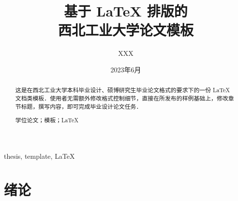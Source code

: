 \documentclass[lang=chs, degree=phd, blindreview=false, adobe=false]{yanputhesis}
\title{基于 LaTeX 排版的 \\ 西北工业大学论文模板}{          %
    Yet Another Thesis Template of \\ Northwestern Polytechnical University
}                                                           %
\author{XXX}{Yilong Ma}                              %
\date{2023年6月}{Jun 2023}                                  %
\begin{document}
\frontmatter                                                %
\maketitle                                                  %
\begin{abstract}                                            %
    这是在西北工业大学本科毕业设计、硕博研究生毕业论文格式的要求下的一份 LaTeX
    文档类模板．使用者无需额外修改格式控制细节，直接在所发布的样例基础上，修改章
    节标题，撰写内容，即可完成毕业设计论文任务．            %
    \begin{keywords}                                        %
        学位论文；模板；\LaTeX                              %
    \end{keywords}                                          %
\end{abstract}                                              %
\begin{engabstract}                                         %
    \noindent \blindtext                                    %
    \begin{engkeywords}                                     %
        thesis, template, \LaTeX                            %
    \end{engkeywords}                                       %
\end{engabstract}                                           %
\tableofcontents                                            %
\mainmatter
\sDefault
\chapter{绪论}
\end{document}

